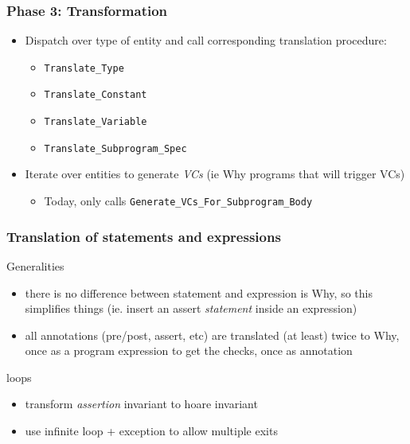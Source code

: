 \documentclass{beamer}
\newenvironment{specialframe}{%
  \begin{frame}[fragile,environment=specialframe]}{\end{frame}}
\begin{document}
\begin{specialframe}\frametitle{Phase 3: Transformation}
      \begin{itemize}
         \item Dispatch over type of entity and call corresponding translation
            procedure:
            \begin{itemize}
                  \item \verb|Translate_Type|
                  \item \verb|Translate_Constant|
                  \item \verb|Translate_Variable|
                  \item \verb|Translate_Subprogram_Spec|
            \end{itemize}
         \item Iterate over entities to generate \emph{VCs} (ie Why programs that
            will trigger VCs)
            \begin{itemize}
               \item Today, only calls \verb|Generate_VCs_For_Subprogram_Body|
            \end{itemize}
      \end{itemize}
\end{specialframe}

\begin{specialframe}\frametitle{Translation of statements and expressions}
   \begin{block}{Generalities}
      \begin{itemize}
         \item there is no difference between statement and expression is Why,
               so this simplifies things (ie. insert an assert \emph{statement}
               inside an expression)
         \item all annotations (pre/post, assert, etc) are translated (at
least) twice to Why, once as a program expression to get the checks, once as
annotation
      \end{itemize}

   \end{block}

   \begin{block}{loops}
      \begin{itemize}
         \item transform \emph{assertion} invariant to hoare invariant
         \item use infinite loop + exception to allow multiple exits
      \end{itemize}
   \end{block}

\end{specialframe}
\end{document}
